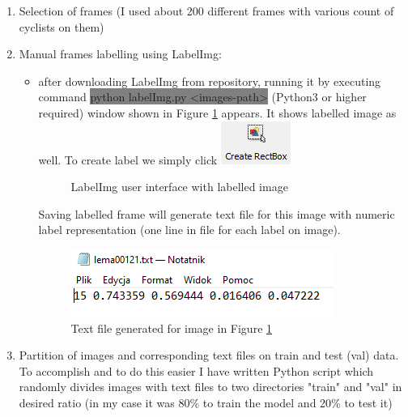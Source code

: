 \begin{enumerate}
\begin{itemize}
    \end{itemize}
    \item Selection of frames (I used about 200 different frames with various count of cyclists on them)
    \item Manual frames labelling using LabelImg:
    \begin{itemize}
        \item after downloading LabelImg from repository, running it by executing command \colorbox{Gray}{python labelImg.py <images-path>} (Python3 or higher required) window shown in Figure \ref{fig:labelimg1} appears. It shows labelled image as well. To create label we simply click \includegraphics[scale=0.75]{images/button}
        \begin{figure}[H]
            \centering
            \caption{LabelImg user interface with labelled image}
            \label{fig:labelimg1}
        \end{figure}
        Saving labelled frame will generate text file for this image with numeric label representation (one line in file for each label on image).
        \begin{figure}[H]
            \centering
            \includegraphics{images/text}
            \caption{Text file generated for image in Figure \ref{fig:labelimg1}}
            \label{fig:labelimg2}
        \end{figure}
    \end{itemize}
    \item Partition of images and corresponding text files on train and test (val) data. To accomplish and to do this easier I have written Python script which randomly divides images with text files to two directories "train" and "val" in desired ratio (in my case it was 80\% to train the model and 20\% to test it)
\end{enumerate}

